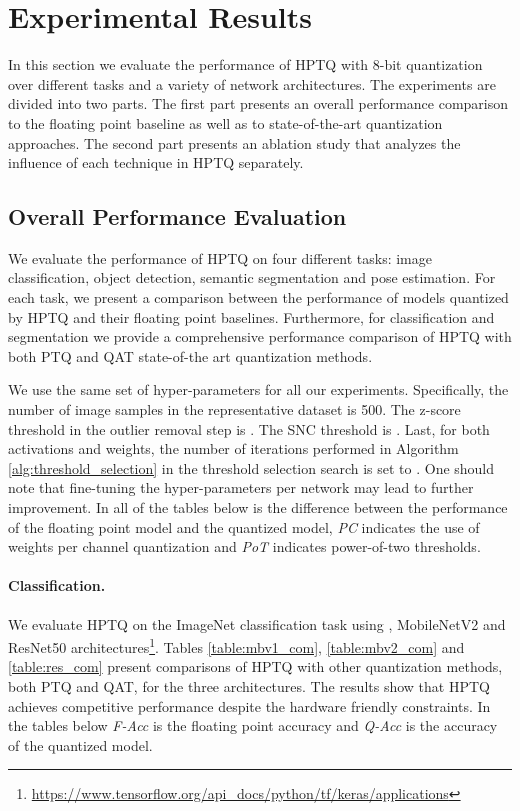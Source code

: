 \documentclass{article}
\newcommand{\mbvtwo}{MobileNetV2 \cite{sandler2018mobilenetv2} }
\newcommand{\res}{ResNet50 \cite{he2016deep} }
\begin{document}
 \section{Experimental Results}\label{sec:experimental}
In this section we evaluate the performance of HPTQ with 8-bit quantization over different tasks and a variety of network architectures. 
The experiments are divided into two parts. The first part presents an overall performance comparison to the floating point baseline as well as to state-of-the-art quantization approaches. The second part presents an ablation study that analyzes the influence of each technique in HPTQ separately.





\subsection{Overall Performance Evaluation}
We evaluate the performance of HPTQ on four different tasks: image classification, object detection, semantic segmentation and pose estimation.
For each task, we present a comparison between the performance of models quantized by HPTQ and their floating point baselines. Furthermore, for classification and segmentation we provide a comprehensive performance comparison of HPTQ with both PTQ and QAT state-of-the art quantization methods.

We use the same set of hyper-parameters for all our experiments.
Specifically, the number of image samples in the representative dataset  is 500. 
The z-score threshold in the outlier removal step is .
The SNC threshold is . 
Last, for both activations and weights, the number of iterations performed in Algorithm \ref{alg:threshold_selection} in the threshold selection search is set to . One should note that fine-tuning the hyper-parameters per network may lead to further improvement.
In all of the tables below  is the difference between the performance of the floating point model and the quantized model, \textit{PC} indicates the use of weights per channel quantization and \textit{PoT} indicates power-of-two thresholds.





\paragraph{Classification.} 
We evaluate HPTQ on the ImageNet classification task \cite{deng2009imagenet}  using \mbvone, \mbvtwo and \res architectures\footnote{\url{https://www.tensorflow.org/api_docs/python/tf/keras/applications}}. 
Tables \ref{table:mbv1_com}, \ref{table:mbv2_com} and \ref{table:res_com} present comparisons of HPTQ with other quantization methods, both PTQ and QAT, for the three architectures. The results show that HPTQ achieves competitive performance despite the hardware friendly constraints.
In the tables below \textit{F-Acc} is the floating point accuracy and \textit{Q-Acc} is the accuracy of the quantized model.
\end{document}
